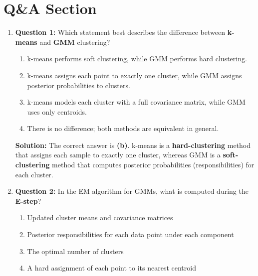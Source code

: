 \documentclass{article}
\begin{document}
\newpage

\section{Q\&A Section}

\begin{enumerate}
    \item \textbf{Question 1:} \newline
    Which statement best describes the difference between \textbf{k-means} and \textbf{GMM} clustering?
    
    \begin{enumerate}
        \item k-means performs soft clustering, while GMM performs hard clustering.
        \item k-means assigns each point to exactly one cluster, while GMM assigns posterior probabilities to clusters.
        \item k-means models each cluster with a full covariance matrix, while GMM uses only centroids.
        \item There is no difference; both methods are equivalent in general.
    \end{enumerate}
    
    \textbf{Solution:} \newline
    The correct answer is \textbf{(b)}. k-means is a \textbf{hard-clustering} method that assigns each sample to exactly one cluster, whereas GMM is a \textbf{soft-clustering} method that computes posterior probabilities (responsibilities) for each cluster.

    \vspace{6pt}

    \item \textbf{Question 2:} \newline
    In the EM algorithm for GMMs, what is computed during the \textbf{E-step}?
    
    \begin{enumerate}
        \item Updated cluster means and covariance matrices
        \item Posterior responsibilities for each data point under each component
        \item The optimal number of clusters
        \item A hard assignment of each point to its nearest centroid
    \end{enumerate}
    

\end{enumerate}
\end{document}

